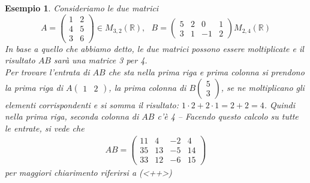 \documentclass{book}
\newtheorem{esempio}{Esempio}
\begin{document}
\begin{esempio}
  Consideriamo le due matrici
  \begin{equation*}
    A=
    \begin{pmatrix}
      1 &2\\
      4 & 5\\
      3 & 6
    \end{pmatrix} \in M_{3,2}(\mathbb{R}), \text{ } B=
    \begin{pmatrix}
      5 & 2 & 0& 1\\
      3 & 1 &-1 &2
    \end{pmatrix} M_{2,4}(\mathbb{R})
  \end{equation*}
  In base a quello che abbiamo detto, le due matrici possono essere moltiplicate e il risultato
  $AB$ sarà una matrice 3 per 4.\\
  Per trovare l'entrata di $AB$ che sta \textit{nella prima riga} e \textit{prima colonna} si
  prendono \emph{la prima riga di} $A
  \begin{pmatrix}
    1 & 2
  \end{pmatrix}
  $, \emph{la prima colonna di} $B
  \begin{pmatrix}
    5\\
    3
  \end{pmatrix}
  $, se ne moltiplicano gli elementi corrispondenti e si somma il risultato:
  $1\cdot 2 + 2\cdot 1=2+2=4$. Quindi nella prima riga, seconda colonna di $AB$ c'è
  4 -- Facendo questo calcolo su tutte le entrate, si vede che
  \begin{eqnarray*}
    AB=
    \begin{pmatrix}
      11 &4 & -2 &4\\
      35 & 13 & -5 & 14\\
      33 & 12 & -6 & 15
    \end{pmatrix}
  \end{eqnarray*}
  per maggiori chiarimento riferirsi a (<++>)
\end{esempio}
\end{document}
